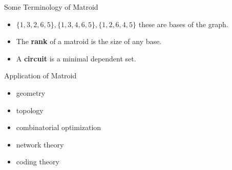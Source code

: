 \documentclass{beamer}
\begin{document}
{\begin{frame}{Some Terminology of Matroid}
\begin{itemize}
        \item <3 -> $\{1,3,2,6,5\} , \{1,3,4,6,5\} , \{1,2,6,4,5\}$ these are bases of the graph.
        \item <4- > The \textbf{rank} of a matroid is the size of any base.
        \item <5- > A \textbf{circuit} is a minimal dependent set.
    \end{itemize}
\end{frame}
}



\begin{frame}{Application of Matroid}

\begin{itemize}
    \item geometry
    \item topology
    \item combinatorial optimization
    \item network theory
    \item coding theory
    \\
    \cite{neel2009matroids}
    \cite{kashyap2009applications}
\end{itemize}
    
\end{frame}
\end{document}
